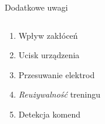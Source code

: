 \documentclass[10pt,aspectratio=169]{beamer}
\begin{document}
\begin{frame}{Dodatkowe uwagi}
  \begin{columns}
    \begin{column}{0.5\textwidth}
      \begin{enumerate}[<+-|alert@+>]
        \item Wpływ zakłóceń
        \item Ucisk urządzenia
        \item Przesuwanie elektrod
        \item \textit{Reużywalność} treningu
        \item Detekcja komend
      \end{enumerate}
    \end{column}
    \hfill
    \begin{column}{0.5\textwidth}
\end{column}
\end{columns}
\end{frame}
\end{document}
